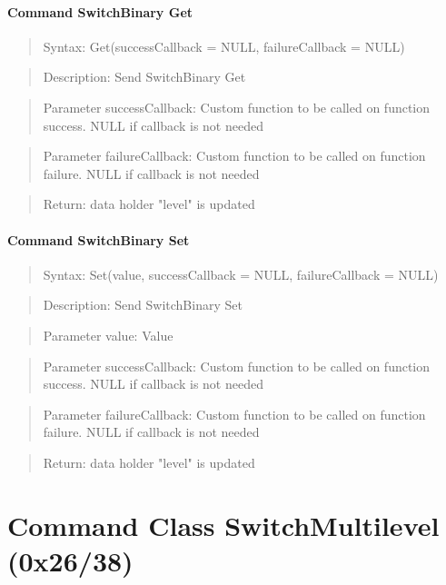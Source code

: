 \paragraph {Command SwitchBinary Get}
\begin{quote} Syntax: Get(successCallback = NULL, failureCallback = NULL)\end{quote}
\begin{quote} Description: Send SwitchBinary Get\end{quote}
\begin{quote} Parameter successCallback: Custom function to be called on function success. NULL if callback is not needed\end{quote}
\begin{quote} Parameter failureCallback: Custom function to be called on function failure. NULL if callback is not needed\end{quote}
\begin{quote} Return: data holder "level" is updated\end{quote}

\paragraph {Command SwitchBinary Set}
\begin{quote} Syntax: Set(value, successCallback = NULL, failureCallback = NULL)\end{quote}
\begin{quote} Description: Send SwitchBinary Set\end{quote}
\begin{quote} Parameter value: Value\end{quote}
\begin{quote} Parameter successCallback: Custom function to be called on function success. NULL if callback is not needed\end{quote}
\begin{quote} Parameter failureCallback: Custom function to be called on function failure. NULL if callback is not needed\end{quote}
\begin{quote} Return: data holder "level" is updated\end{quote}

\section{Command Class SwitchMultilevel (0x26/38)}

